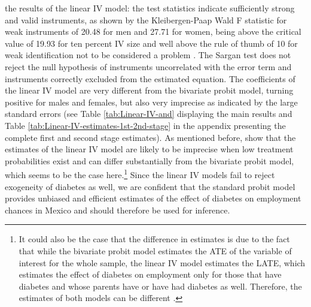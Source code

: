 the results of the linear \ac{IV} model: the test statistics indicate
sufficiently strong and valid instruments, as shown by the Kleibergen-Paap
Wald F statistic for weak instruments of 20.48 for men and 27.71 for
women, being above the critical value of 19.93 for ten percent \ac{IV}
size and well above the rule of thumb of 10 for weak identification
not to be considered a problem \parencite{Staiger1997,Baum2007}. The
Sargan test does not reject the null hypothesis of instruments uncorrelated
with the error term and instruments correctly excluded from the estimated
equation. The coefficients of the linear \ac{IV} model are very different
from the bivariate probit model, turning positive for males and females,
but also very imprecise as indicated by the large standard errors
(see Table \ref{tab:Linear-IV-and} displaying the main results and
Table \ref{tab:Linear-IV-estimates-1st-2nd-stage} in the appendix
presenting the complete first and second stage estimates). As mentioned
before, \textcite{Chiburis2012} show that the estimates of the linear
\ac{IV} model are likely to be imprecise when low treatment probabilities
exist and can differ substantially from the bivariate probit model,
which seems to be the case here.\footnote{It could also be the case that the difference in estimates is due
to the fact that while the bivariate probit model estimates the \ac{ATE}
of the variable of interest for the whole sample, the linear \ac{IV}
model estimates the \ac{LATE}, which estimates the effect of diabetes
on employment only for those that have diabetes and whose parents
have or have had diabetes as well. Therefore, the estimates of both
models can be different \parencite{Angrist2009a,Chiburis2012}.} Since the linear \ac{IV} models fail to reject exogeneity of diabetes
as well, we are confident that the standard probit model provides
unbiased and efficient estimates of the effect of diabetes on employment
chances in Mexico and should therefore be used for inference.


